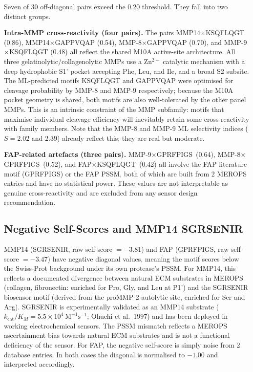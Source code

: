 \documentclass[10pt,a4paper]{article}
\begin{document}
Seven of 30 off-diagonal pairs exceed the 0.20 threshold. They fall into two distinct
groups.

\textbf{Intra-MMP cross-reactivity (four pairs).}
The pairs MMP14$\times$KSQFLQGT (0.86), MMP14$\times$GAPPVQAP (0.54),
MMP-8$\times$GAPPVQAP (0.70), and MMP-9$\times$KSQFLQGT (0.48) all reflect the
shared M10A active-site architecture. All three gelatinolytic/collagenolytic MMPs use
a Zn$^{2+}$ catalytic mechanism with a deep hydrophobic S1' pocket accepting Phe, Leu,
and Ile, and a broad S2 subsite. The ML-predicted motifs KSQFLQGT and GAPPVQAP were
optimised for cleavage probability by MMP-8 and MMP-9 respectively; because the M10A
pocket geometry is shared, both motifs are also well-tolerated by the other panel MMPs.
This is an intrinsic constraint of the MMP subfamily: motifs that maximise individual
cleavage efficiency will inevitably retain some cross-reactivity with family members.
Note that the MMP-8 and MMP-9 ML selectivity indices ($S = 2.02$ and $2.39$) already
reflect this; they are real but moderate.

\textbf{FAP-related artefacts (three pairs).}
MMP-9$\times$GPRFPIGS~(0.64), MMP-8$\times$GPRFPIGS~(0.52), and
FAP$\times$KSQFLQGT~(0.42) all involve the FAP literature motif (GPRFPIGS) or the FAP
PSSM, both of which are built from 2 MEROPS entries and have no statistical power.
These values are not interpretable as genuine cross-reactivity and are excluded from any
sensor design recommendation.

\subsection{Negative Self-Scores and MMP14 SGRSENIR}
\label{sec:negself}

MMP14 (SGRSENIR, raw self-score $= -3.81$) and FAP (GPRFPIGS, raw self-score $= -3.47$)
have negative diagonal values, meaning the motif scores below the Swiss-Prot background
under its own protease's PSSM. For MMP14, this reflects a documented divergence between
natural ECM substrates in MEROPS (collagen, fibronectin: enriched for Pro, Gly, and Leu
at P1') and the SGRSENIR biosensor motif (derived from the proMMP-2 autolytic site,
enriched for Ser and Arg). SGRSENIR is experimentally validated as an MMP14 substrate
($k_{\text{cat}}/K_M = 5.5 \times 10^4\ \text{M}^{-1}\text{s}^{-1}$; Ohuchi et al.\
1997) and has been deployed in working electrochemical sensors. The PSSM mismatch
reflects a MEROPS ascertainment bias towards natural ECM substrates and is not a
functional deficiency of the sensor. For FAP, the negative self-score is simply noise
from 2 database entries. In both cases the diagonal is normalised to $-1.00$ and
interpreted accordingly.
\end{document}

